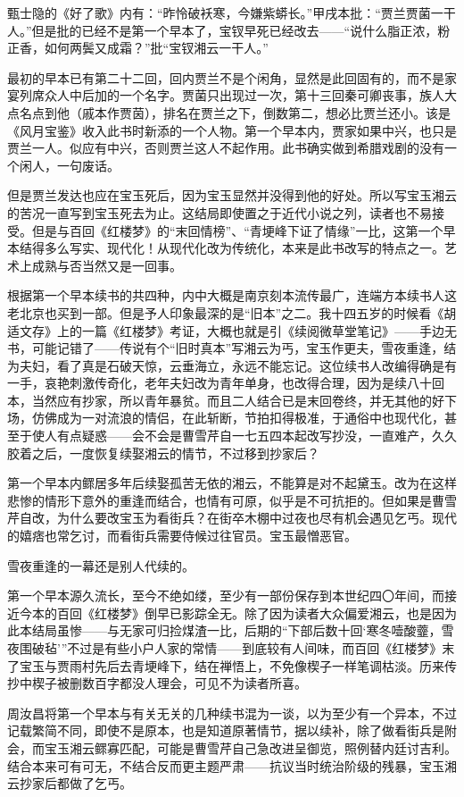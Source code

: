 \par 甄士隐的《好了歌》内有：“昨怜破袄寒，今嫌紫蟒长。”甲戌本批：“贾兰贾菌一干人。”但是批的已经不是第一个早本了，宝钗早死已经改去——“说什么脂正浓，粉正香，如何两鬓又成霜？”批“宝钗湘云一干人。”
\par 最初的早本已有第二十二回，回内贾兰不是个闲角，显然是此回固有的，而不是家宴列席众人中后加的一个名字。贾菌只出现过一次，第十三回秦可卿丧事，族人大点名点到他（戚本作贾茵），排名在贾兰之下，倒数第二，想必比贾兰还小。该是《风月宝鉴》收入此书时新添的一个人物。第一个早本内，贾家如果中兴，也只是贾兰一人。似应有中兴，否则贾兰这人不起作用。此书确实做到希腊戏剧的没有一个闲人，一句废话。
\par 但是贾兰发达也应在宝玉死后，因为宝玉显然并没得到他的好处。所以写宝玉湘云的苦况一直写到宝玉死去为止。这结局即使置之于近代小说之列，读者也不易接受。但是与百回《红楼梦》的“末回情榜”、“青埂峰下证了情缘”一比，这第一个早本结得多么写实、现代化！从现代化改为传统化，本来是此书改写的特点之一。艺术上成熟与否当然又是一回事。
\par 根据第一个早本续书的共四种，内中大概是南京刻本流传最广，连端方本续书人这老北京也买到一部。但是予人印象最深的是“旧本”之二。我十四五岁的时候看《胡适文存》上的一篇《红楼梦》考证，大概也就是引《续阅微草堂笔记》——手边无书，可能记错了——传说有个“旧时真本”写湘云为丐，宝玉作更夫，雪夜重逢，结为夫妇，看了真是石破天惊，云垂海立，永远不能忘记。这位续书人改编得确是有一手，哀艳刺激传奇化，老年夫妇改为青年单身，也改得合理，因为是续八十回本，当然应有抄家，所以青年暴贫。而且二人结合已是末回卷终，并无其他的好下场，仿佛成为一对流浪的情侣，在此斩断，节拍扣得极准，于通俗中也现代化，甚至于使人有点疑惑——会不会是曹雪芹自一七五四本起改写抄没，一直难产，久久胶着之后，一度恢复续娶湘云的情节，不过移到抄家后？
\par 第一个早本内鳏居多年后续娶孤苦无依的湘云，不能算是对不起黛玉。改为在这样悲惨的情形下意外的重逢而结合，也情有可原，似乎是不可抗拒的。但如果是曹雪芹自改，为什么要改宝玉为看街兵？在街卒木棚中过夜也尽有机会遇见乞丐。现代的嬉痞也常乞讨，而看街兵需要侍候过往官员。宝玉最憎恶官。
\par 雪夜重逢的一幕还是别人代续的。
\par 第一个早本源久流长，至今不绝如缕，至少有一部份保存到本世纪四〇年间，而接近今本的百回《红楼梦》倒早已影踪全无。除了因为读者大众偏爱湘云，也是因为此本结局虽惨——与无家可归捡煤渣一比，后期的“下部后数十回‘寒冬噎酸虀，雪夜围破毡’”不过是有些小户人家的常情——到底较有人间味，而百回《红楼梦》末了宝玉与贾雨村先后去青埂峰下，结在禅悟上，不免像楔子一样笔调枯淡。历来传抄中楔子被删数百字都没人理会，可见不为读者所喜。
\par 周汝昌将第一个早本与有关无关的几种续书混为一谈，以为至少有一个异本，不过记载繁简不同，即使不是原本，也是知道原著情节，据以续补，除了做看街兵是附会，而宝玉湘云鳏寡匹配，可能是曹雪芹自己急改进呈御览，照例替内廷讨吉利。结合本来可有可无，不结合反而更主题严肃——抗议当时统治阶级的残暴，宝玉湘云抄家后都做了乞丐。
